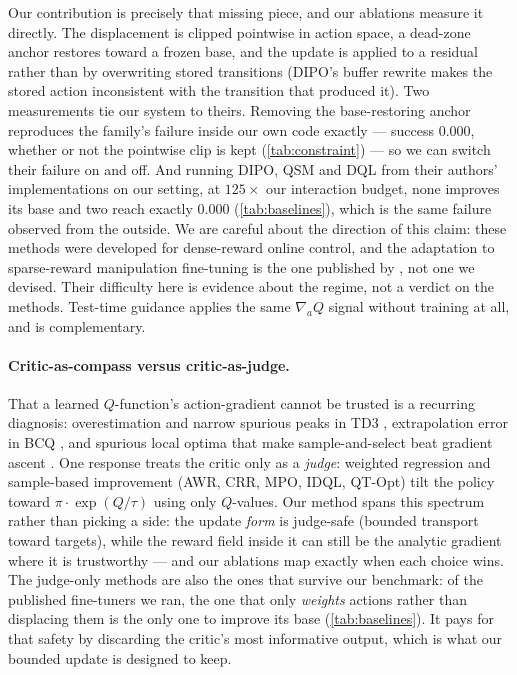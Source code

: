 Our contribution is precisely that missing piece, and our ablations measure
it directly. The displacement is clipped pointwise in action space, a
dead-zone anchor restores toward a frozen base, and the update is applied to
a residual rather than by overwriting stored transitions (DIPO's buffer
rewrite makes the stored action inconsistent with the transition that
produced it). Two measurements tie our system to theirs. Removing the
base-restoring anchor reproduces the family's failure inside our own code
exactly --- success $0.000$, whether or not the pointwise clip is kept
(\cref{tab:constraint}) --- so we can switch their failure on and off. And
running DIPO, QSM and DQL from their authors' implementations on our setting,
at $125\times$ our interaction budget, none improves its base and two reach
exactly $0.000$ (\cref{tab:baselines}), which is the same failure observed
from the outside. We are careful about the direction of this claim: these
methods were developed for dense-reward online control, and the adaptation to
sparse-reward manipulation fine-tuning is the one published by
\citet{ren2024dppo}, not one we devised. Their difficulty here is evidence
about the regime, not a verdict on the methods. Test-time guidance
\citep{qgf2026} applies the same $\nabla_a Q$ signal without training at all,
and is complementary.

\paragraph{Critic-as-compass versus critic-as-judge.}
That a learned $Q$-function's action-gradient cannot be trusted is a
recurring diagnosis: overestimation and narrow spurious peaks in TD3
\citep{fujimoto2018td3}, extrapolation error in BCQ
\citep{fujimoto2019bcq}, and spurious local optima that make
sample-and-select beat gradient ascent \citep{savo2025}. One response
treats the critic only as a \emph{judge}: weighted regression and
sample-based improvement (AWR, CRR, MPO, IDQL, QT-Opt)
\citep{peng2019awr,wang2020crr,abdolmaleki2018mpo,hansenestruch2023idql,kalashnikov2018qtopt}
tilt the policy toward $\pi \cdot \exp(Q/\tau)$ using only $Q$-values.
Our method spans this spectrum rather than picking a side: the update
\emph{form} is judge-safe (bounded transport toward targets), while the
reward field inside it can still be the analytic gradient where it is
trustworthy --- and our ablations map exactly when each choice wins. The
judge-only methods are also the ones that survive our benchmark: of the
published fine-tuners we ran, the one that only \emph{weights} actions rather
than displacing them is the only one to improve its base
(\cref{tab:baselines}). It pays for that safety by discarding the critic's
most informative output, which is what our bounded update is designed to
keep.

